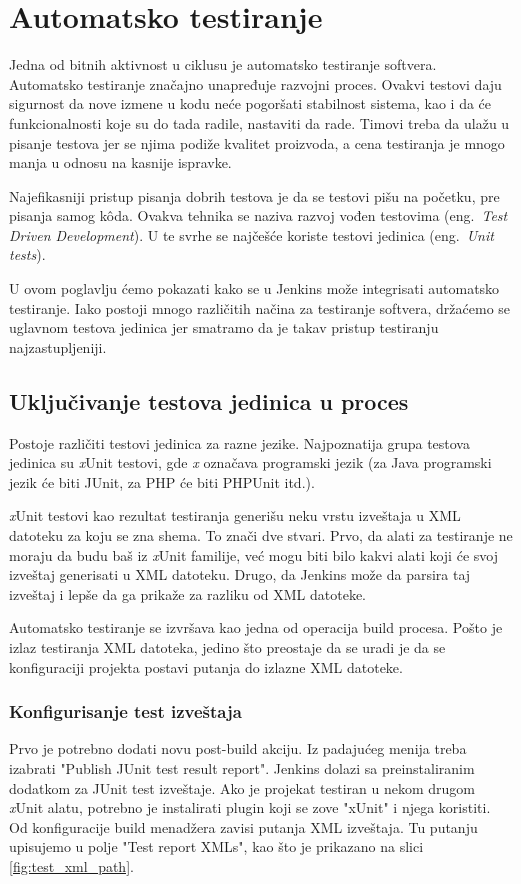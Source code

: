 \section{Automatsko testiranje}
Jedna od bitnih aktivnost u ciklusu je automatsko testiranje softvera. Automatsko testiranje značajno unapređuje razvojni proces. Ovakvi testovi daju sigurnost da nove izmene u kodu neće pogoršati stabilnost sistema, kao i da će funkcionalnosti koje su do tada radile, nastaviti da rade. Timovi treba da ulažu u pisanje testova jer se njima podiže kvalitet proizvoda, a cena testiranja je mnogo manja u odnosu na kasnije ispravke.

Najefikasniji pristup pisanja dobrih testova je da se testovi pišu na početku, pre pisanja samog k\^oda. Ovakva tehnika se naziva razvoj vođen testovima (eng.~{\em Test Driven Development}). U te svrhe se najčešće koriste testovi jedinica (eng.~{\em Unit tests}). 

U ovom poglavlju ćemo pokazati kako se u Jenkins može integrisati automatsko testiranje. Iako postoji mnogo različitih načina za testiranje softvera, držaćemo se uglavnom testova jedinica jer smatramo da je takav pristup testiranju najzastupljeniji.

\subsection{Uključivanje testova jedinica u proces}
Postoje različiti testovi jedinica za razne jezike. Najpoznatija grupa testova jedinica su \textit{x}Unit testovi, gde \textit{x} označava programski jezik (za Java programski jezik će biti JUnit, za PHP će biti PHPUnit itd.). 

\textit{x}Unit testovi kao rezultat testiranja generišu neku vrstu izveštaja u XML datoteku za koju se zna shema. To znači dve stvari. Prvo, da alati za testiranje ne moraju da budu baš iz \textit{x}Unit familije, već mogu biti bilo kakvi alati koji će svoj izveštaj generisati u XML datoteku. Drugo, da Jenkins može da parsira taj izveštaj i lepše da ga prikaže za razliku od XML datoteke.

Automatsko testiranje se izvršava kao jedna od operacija build procesa. Pošto je izlaz testiranja XML datoteka, jedino što preostaje da se uradi je da se konfiguraciji projekta postavi putanja do izlazne XML datoteke.

\subsubsection{Konfigurisanje test izveštaja}
Prvo je potrebno dodati novu post-build akciju. Iz padajućeg menija treba izabrati "Publish JUnit test result report". Jenkins dolazi sa preinstaliranim dodatkom za JUnit test izveštaje. Ako je projekat testiran u nekom drugom \textit{x}Unit alatu, potrebno je instalirati plugin koji se zove "xUnit" i njega koristiti. Od konfiguracije build menadžera zavisi putanja XML izveštaja. Tu putanju upisujemo u polje "Test report XMLs", kao što je prikazano na slici \ref{fig:test_xml_path}. 

